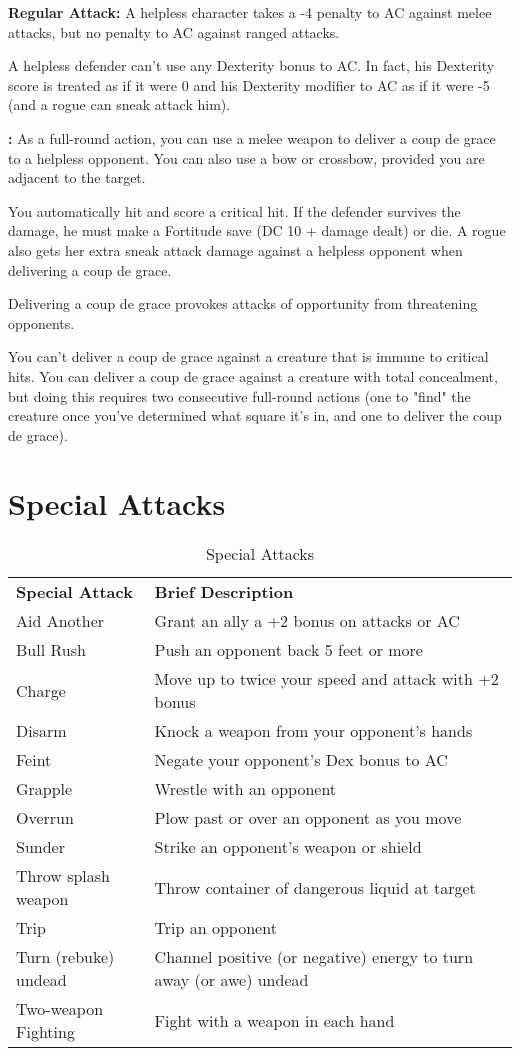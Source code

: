 \textbf{Regular Attack:} A helpless character takes a -4 penalty to AC against 
melee attacks, but no penalty to AC against ranged attacks.

A helpless defender can't use any Dexterity bonus to AC. In fact, his Dexterity 
score is treated as if it were 0 and his Dexterity modifier to AC as if it were 
-5 (and a rogue can sneak attack him).

\textbf{:} As a full-round action, you can use a melee weapon to deliver 
a coup de grace to a helpless opponent. You can also use a bow or crossbow, provided 
you are adjacent to the target.

You automatically hit and score a critical hit. If the defender survives the damage, 
he must make a Fortitude save (DC 10 + damage dealt) or die. A rogue also gets 
her extra sneak attack damage against a helpless opponent when delivering a coup 
de grace.

Delivering a coup de grace provokes attacks of opportunity from threatening opponents.

You can't deliver a coup de grace against a creature that is immune to critical 
hits. You can deliver a coup de grace against a creature with total concealment, 
but doing this requires two consecutive full-round actions (one to "find" the 
creature once you've determined what square it's in, and one to deliver the coup 
de grace).

\section{Special Attacks}

\begin{table}[htb]
\mcinherit
\caption{Special Attacks}
\centering
\begin{tabular}{ll}
\textbf{Special Attack} & \textbf{Brief Description}\\
Aid Another & Grant an ally a +2 bonus on attacks or AC\\
Bull Rush & Push an opponent back 5 feet or more\\
Charge & Move up to twice your speed and attack with +2 bonus\\
Disarm & Knock a weapon from your opponent's hands\\
Feint & Negate your opponent's Dex bonus to AC\\
Grapple & Wrestle with an opponent\\
Overrun & Plow past or over an opponent as you move\\
Sunder & Strike an opponent's weapon or shield\\
Throw splash weapon & Throw container of dangerous liquid at target\\
Trip & Trip an opponent\\
Turn (rebuke) undead & Channel positive (or negative) energy to turn away (or awe) undead\\
Two-weapon Fighting & Fight with a weapon in each hand\\
\end{tabular}
\end{table}

